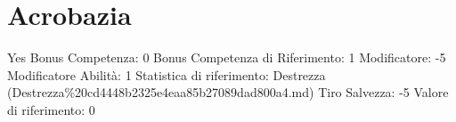 \section{Acrobazia}\label{acrobazia}

\begin{description}
\tightlist
\item[Tags: ABI]
Yes Bonus Competenza: 0 Bonus Competenza di Riferimento: 1 Modificatore:
-5 Modificatore Abilità: 1 Statistica di riferimento: Destrezza
(Destrezza\%20cd4448b2325e4eaa85b27089dad800a4.md) Tiro Salvezza: -5
Valore di riferimento: 0
\end{description}
